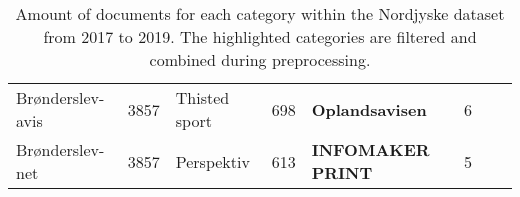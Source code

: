 \begin{table*}[h]
\begin{tabular}{l|c|l|c|l|c|l|c}
		Brønderslev-avis    &  3857  & Thisted sport   &  698   & \textbf{Oplandsavisen}         &   6    &                                &        \\
		Brønderslev-net     &  3857  & Perspektiv      &  613   & \textbf{INFOMAKER PRINT}       &   5    &                                &        \\
		\bottomrule
	\end{tabular}
	\caption{Amount of documents for each category within the Nordjyske dataset from 2017 to 2019.
		The highlighted categories are filtered and combined during preprocessing.}
	\label{tab:category_table}
\end{table*}